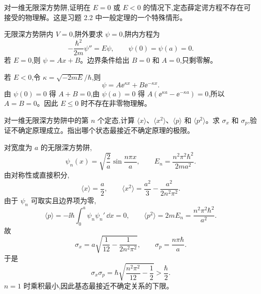 \begin{question}
对一维无限深方势阱,证明在 $E=0$ 或 $E<0$ 的情况下,定态薛定谔方程不存在可接受的物理解。这是习题 2.2 中一般定理的一个特殊情形。
\end{question}
\begin{solution}
无限深方势阱内 $V=0$,阱外要求 $\psi=0$,阱内方程为
\[
-\frac{\hbar^2}{2m}\psi''=E\psi,
\qquad \psi(0)=\psi(a)=0.
\]
若 $E=0$,则 $\psi=Ax+B$。边界条件给出 $B=0$ 和 $A=0$,只剩零解。

若 $E<0$,令 $\kappa=\sqrt{-2mE}/\hbar$,则
\[
\psi=A\ee^{\kappa x}+B\ee^{-\kappa x}.
\]
由 $\psi(0)=0$ 得 $A+B=0$,由 $\psi(a)=0$ 得 $A(\ee^{\kappa a}-\ee^{-\kappa a})=0$,所以 $A=B=0$。因此 $E\le0$ 时不存在非零物理解。
\end{solution}

\begin{question}
对一维无限深方势阱中的第 $n$ 个定态,计算 $\langle x\rangle$、$\langle x^2\rangle$、$\langle p\rangle$ 和 $\langle p^2\rangle$。求 $\sigma_x$ 和 $\sigma_p$,验证不确定原理成立。指出哪个状态最接近不确定原理的极限。
\end{question}
\begin{solution}
对宽度为 $a$ 的无限深方势阱,
\[
\psi_n(x)=\sqrt{\frac2a}\sin\frac{n\pi x}{a},\qquad
E_n=\frac{n^2\pi^2\hbar^2}{2ma^2}.
\]
由对称性或直接积分,
\[
\langle x\rangle=\frac a2,
\qquad
\langle x^2\rangle=\frac{a^2}{3}-\frac{a^2}{2n^2\pi^2}.
\]
由于 $\psi_n$ 可取实且边界项为零,
\[
\langle p\rangle=-\ii\hbar\int_0^a\psi_n\psi_n'\,\dd x=0,
\qquad
\langle p^2\rangle=2mE_n=\frac{n^2\pi^2\hbar^2}{a^2}.
\]
故
\[
\sigma_x=a\sqrt{\frac1{12}-\frac1{2n^2\pi^2}},
\qquad
\sigma_p=\frac{n\pi\hbar}{a}.
\]
于是
\[
\sigma_x\sigma_p
=\hbar\sqrt{\frac{n^2\pi^2}{12}-\frac12}>\frac{\hbar}{2}.
\]
$n=1$ 时乘积最小,因此基态最接近不确定关系的下限。
\end{solution}

